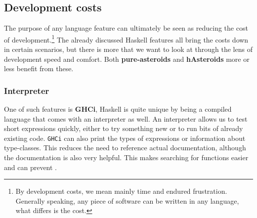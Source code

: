 \documentclass[
  digital, %
  color,   %
  table,   %
  oneside, %
  lof,     %
  lot,     %
]{fithesis3}
\begin{document}
{\subsection{Development costs}

The purpose of any language feature can ultimately be seen as reducing the cost of development.\footnote{
By development costs, we mean mainly time and endured frustration. Generally speaking,
any piece of software can be written in any language, what differs is the cost.
}
The already discussed Haskell features all bring the costs down in certain scenarios, but there is more
that we want to look at through the lens of development speed and comfort.
Both \textbf{pure-asteroids} and \textbf{hAsteroids} more or less benefit from these.

\subsubsection{Interpreter}
One of such features is \textbf{GHCi}, \cite{ghciwiki}
Haskell is quite unique by being a compiled language that comes with an interpreter as well.
An interpreter allows us to test short expressions quickly, either to try something new or to
run bits of already existing code. \texttt{GHCi} can also print the types of expressions
or information about type-classes. This reduces the need to reference actual documentation,
although the documentation is also very helpful. \cite{hoogle} This makes searching for functions easier
and can prevent .

}
\end{document}
